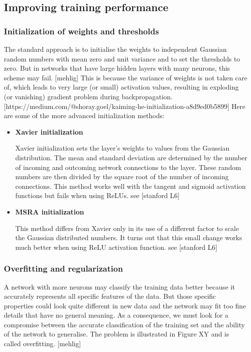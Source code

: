 \subsection{Improving training performance}
\subsubsection{Initialization of weights and thresholds}

The standard approach is to initialise the weights to independent Gaussian random numbers with mean zero and unit variance and to set the thresholds to zero. But in networks that have large hidden layers with many neurons, this scheme may fail. [mehlig] This is because the variance of weights is not taken care of, which leads to very large (or small) activation values, resulting in exploding (or vanishing) gradient problem during backpropagation. [https://medium.com/@shoray.goel/kaiming-he-initialization-a8d9ed0b5899] Here are some of the more advanced initialization methods:

\begin{itemize}
	\item \textbf{Xavier initialization}
		
	Xavier initialization sets the layer’s weights to values from the Gaussian distribution. The mean and standard deviation are determined by the number of incoming and outcoming network connections to the layer. These random numbers are then divided by the square root of the number of incoming connections. This method works well with the tangent and sigmoid activation functions but fails when using ReLUs. see [stanford L6]	
	
	\item \textbf{MSRA initialization}

	This method differs from Xavier only in its use of a different factor to scale the Gaussian distributed numbers. It turns out that this small change works much better when using ReLU activation function. see [stanford L6]
	
\end{itemize}

\subsubsection{Overfitting and regularization}
A network with more neurons may classify the training data better because it accurately represents all specific features of the data. But those specific properties could look quite different in new data and the network may fit too fine details that have no general meaning. As a consequence, we must look for a compromise between the accurate classification of the training set and the ability of the network to generalise. The problem is illustrated in Figure XY and is called overfitting. [mehlig]


